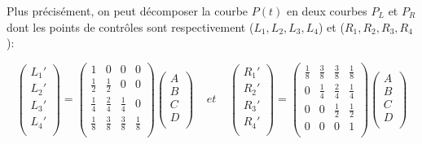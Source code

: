 \documentclass{article}
\begin{document}
Plus pr\'{e}cis\'{e}ment, on peut d\'{e}composer la courbe $P(t)$ en deux courbes $P_L$ et $P_R$ dont les points de
contr\^{o}les sont respectivement ($L_1 , L_2 , L_3 , L_4$) et ($R_1 , R_2 , R_3 , R_4$):

\[\begin{pmatrix}
L_1' \\
L_2' \\
L_3' \\ 
L_4'\\
\end{pmatrix}
=
\begin{pmatrix}
1 & 0 & 0 & 0 \\[5pt]
\frac{1}{2} & \frac{1}{2} & 0 & 0 \\[5pt]
\frac{1}{4} & \frac{2}{4} & \frac{1}{4} & 0 \\[5pt] 
\frac{1}{8} & \frac{3}{8} & \frac{3}{8} & \frac{1}{8} \\[5pt]
\end{pmatrix}
\begin{pmatrix}
A \\
B \\
C \\ 
D \\
\end{pmatrix}
\;\;\;\;
et
\;\;\;\;
\begin{pmatrix}
R_1' \\
R_2' \\
R_3' \\ 
R_4'\\
\end{pmatrix}
=
\begin{pmatrix}
\frac{1}{8} & \frac{3}{8} & \frac{3}{8} & \frac{1}{8} \\[5pt]
0 & \frac{1}{4} & \frac{2}{4} & \frac{1}{4} \\[5pt]
0 & 0 & \frac{1}{2} & \frac{1}{2} \\[5pt] 
0 & 0 & 0 & 1 \\[5pt]
\end{pmatrix}
\begin{pmatrix}
A \\
B \\
C \\ 
D \\
\end{pmatrix}\]
\end{document}
